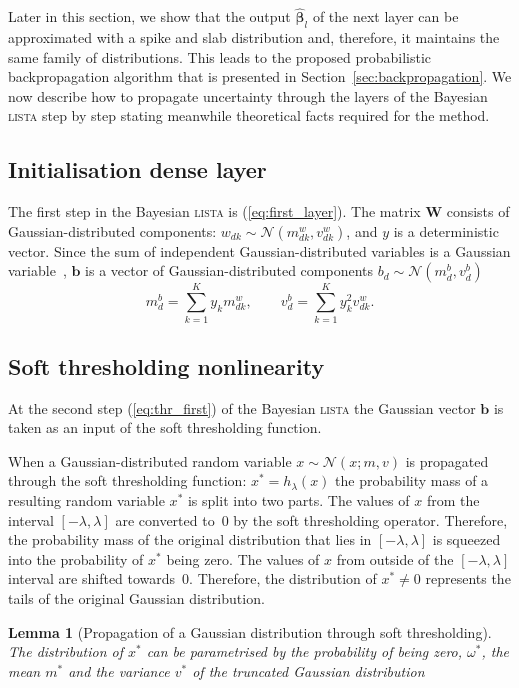 \documentclass{article}
\newtheorem{lemma}{Lemma}
\begin{document}
Later in this section, we show that the output $\widehat{\boldsymbol\beta}_l$ of the next layer can be approximated with a spike and slab distribution and, therefore, it maintains the same family of distributions. This leads to the proposed probabilistic backpropagation algorithm that is presented in Section~\ref{sec:backpropagation}. We now describe how to propagate uncertainty through the layers of the Bayesian \textsc{lista} step by step stating meanwhile theoretical facts required for the method.

\subsection{Initialisation dense layer}
The first step in the Bayesian \textsc{lista} is (\ref{eq:first_layer}). The matrix $\mathbf{W}$ consists of Gaussian-distributed components: $w_{dk} \sim \mathcal{N}(m^w_{dk}, v^w_{dk})$, and $y$ is a deterministic vector. Since the sum of independent Gaussian-distributed variables is a Gaussian variable~\citep{eisenberg2008sum}, $\mathbf{b}$ is a vector of Gaussian-distributed components $b_d \sim \mathcal{N}(m^b_d, v^b_d)$
\begin{equation}
\label{eq:matrix_vector_product}
m^b_d = \sum_{k=1}^Ky_k m^w_{dk}, \qquad
v^b_d = \sum_{k=1}^Ky_k^2v^w_{dk}.
\end{equation}


\subsection{Soft thresholding nonlinearity}
At the second step (\ref{eq:thr_first}) of the Bayesian \textsc{lista} the Gaussian vector $\mathbf{b}$ is taken as an input of the soft thresholding function.

When a Gaussian-distributed random variable $x \sim \mathcal{N}(x; m, v)$ is propagated through the soft thresholding function: $x^* = h_{\lambda}(x)$ the probability mass of a resulting random variable $x^*$ is split into two parts. The values of $x$ from the interval $[-\lambda, \lambda]$ are converted to~$0$ by the soft thresholding operator. Therefore, the probability mass of the original distribution that lies in $[-\lambda, \lambda]$ is squeezed into the probability of $x^*$ being zero. The values of $x$ from outside of the $[-\lambda, \lambda]$ interval are shifted towards~$0$. Therefore, the distribution of $x^* \neq 0$ represents the tails of the original Gaussian distribution.

\begin{lemma}[Propagation of a Gaussian distribution through soft thresholding]
\label{thm:soft_thresholding}
The distribution of $x^*$ can be parametrised by the probability of being zero, $\omega^*$, the mean $m^*$ and the variance $v^*$ of the truncated Gaussian distribution
\end{lemma}
\end{document}
